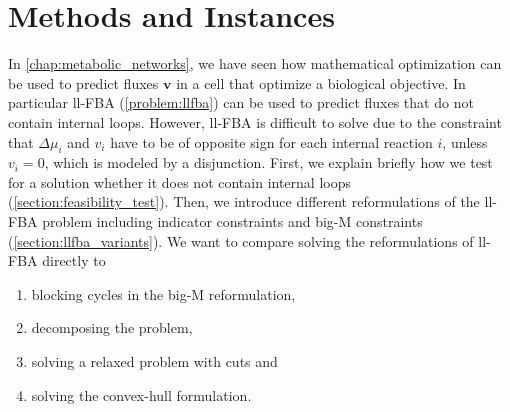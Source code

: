 \thispagestyle{plain}
\chapter{Methods and Instances} \label{chap:methods}

In \cref{chap:metabolic_networks}, we have seen how mathematical optimization can be used to predict fluxes $\mathbf v$ in a cell that optimize a biological objective. In particular \textsf{ll-FBA} (\cref{problem:llfba}) can be used to predict fluxes that do not contain internal loops. However, \textsf{ll-FBA} is difficult to solve due to the constraint that $\Delta \mu_i$ and $v_i$ have to be of opposite sign for each internal reaction $i$, unless $v_i=0$, which is modeled by a disjunction. %
First, we explain briefly how we test for a solution whether it does not contain internal loops (\cref{section:feasibility_test}). Then, we introduce different reformulations of the \textsf{ll-FBA} problem including indicator constraints and big-M constraints (\cref{section:llfba_variants}).
We want to compare solving the reformulations of \textsf{ll-FBA} directly to 
\begin{enumerate}
    \item blocking cycles in the big-M reformulation,
    \item decomposing the problem,
    \item solving a relaxed problem with cuts and
    \item solving the convex-hull formulation.
\end{enumerate}


